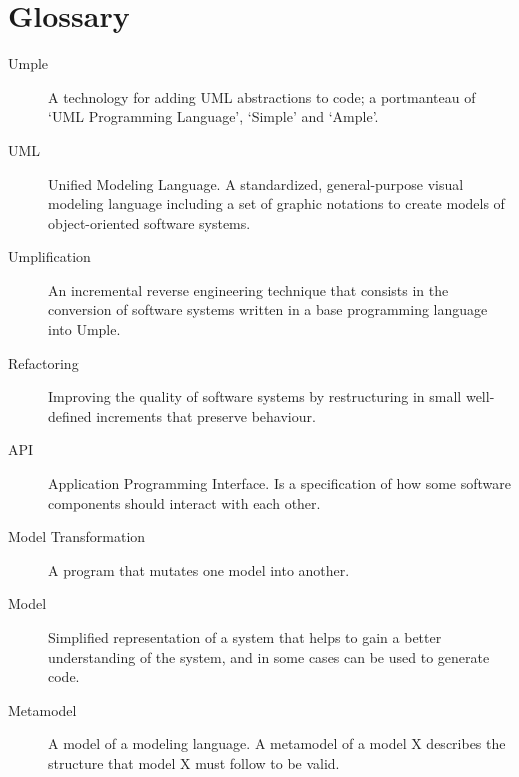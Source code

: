 \chapter{Glossary}
\label{chap:glossary}

\begin{description}
\item[Umple] 
A technology for adding UML abstractions to code; a portmanteau of `UML Programming Language', `Simple' and `Ample'.
\item[UML]
Unified Modeling Language. A standardized, general-purpose visual modeling language including a set of graphic notations to create models of object-oriented software systems.
\item[Umplification]
An incremental reverse engineering technique that consists in the conversion of software systems written in a base programming language into Umple.
\item[Refactoring]
Improving the quality of software systems by restructuring in small well-defined increments that preserve behaviour.
\item[API]
Application Programming Interface. Is a specification of how some software components should interact with each other.
\item[Model Transformation]
A program that mutates one model into another.
\item[Model]
Simplified representation of a system that helps to gain a better understanding of the system, and in some cases can be used to generate code.
\item[Metamodel]
A model of a modeling language. A metamodel of a model X describes the structure that model X must follow to be valid.
\end{description}

